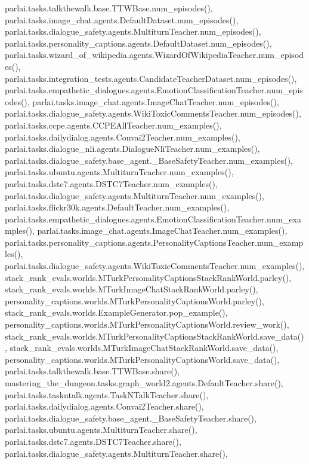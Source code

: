 parlai.\+tasks.\+talkthewalk.\+base.\+T\+T\+W\+Base.\+num\+\_\+episodes(), parlai.\+tasks.\+image\+\_\+chat.\+agents.\+Default\+Dataset.\+num\+\_\+episodes(), parlai.\+tasks.\+dialogue\+\_\+safety.\+agents.\+Multiturn\+Teacher.\+num\+\_\+episodes(), parlai.\+tasks.\+personality\+\_\+captions.\+agents.\+Default\+Dataset.\+num\+\_\+episodes(), parlai.\+tasks.\+wizard\+\_\+of\+\_\+wikipedia.\+agents.\+Wizard\+Of\+Wikipedia\+Teacher.\+num\+\_\+episodes(), parlai.\+tasks.\+integration\+\_\+tests.\+agents.\+Candidate\+Teacher\+Dataset.\+num\+\_\+episodes(), parlai.\+tasks.\+empathetic\+\_\+dialogues.\+agents.\+Emotion\+Classification\+Teacher.\+num\+\_\+episodes(), parlai.\+tasks.\+image\+\_\+chat.\+agents.\+Image\+Chat\+Teacher.\+num\+\_\+episodes(), parlai.\+tasks.\+dialogue\+\_\+safety.\+agents.\+Wiki\+Toxic\+Comments\+Teacher.\+num\+\_\+episodes(), parlai.\+tasks.\+ccpe.\+agents.\+C\+C\+P\+E\+All\+Teacher.\+num\+\_\+examples(), parlai.\+tasks.\+dailydialog.\+agents.\+Convai2\+Teacher.\+num\+\_\+examples(), parlai.\+tasks.\+dialogue\+\_\+nli.\+agents.\+Dialogue\+Nli\+Teacher.\+num\+\_\+examples(), parlai.\+tasks.\+dialogue\+\_\+safety.\+base\+\_\+agent.\+\_\+\+Base\+Safety\+Teacher.\+num\+\_\+examples(), parlai.\+tasks.\+ubuntu.\+agents.\+Multiturn\+Teacher.\+num\+\_\+examples(), parlai.\+tasks.\+dstc7.\+agents.\+D\+S\+T\+C7\+Teacher.\+num\+\_\+examples(), parlai.\+tasks.\+dialogue\+\_\+safety.\+agents.\+Multiturn\+Teacher.\+num\+\_\+examples(), parlai.\+tasks.\+flickr30k.\+agents.\+Default\+Teacher.\+num\+\_\+examples(), parlai.\+tasks.\+empathetic\+\_\+dialogues.\+agents.\+Emotion\+Classification\+Teacher.\+num\+\_\+examples(), parlai.\+tasks.\+image\+\_\+chat.\+agents.\+Image\+Chat\+Teacher.\+num\+\_\+examples(), parlai.\+tasks.\+personality\+\_\+captions.\+agents.\+Personality\+Captions\+Teacher.\+num\+\_\+examples(), parlai.\+tasks.\+dialogue\+\_\+safety.\+agents.\+Wiki\+Toxic\+Comments\+Teacher.\+num\+\_\+examples(), stack\+\_\+rank\+\_\+evals.\+worlds.\+M\+Turk\+Personality\+Captions\+Stack\+Rank\+World.\+parley(), stack\+\_\+rank\+\_\+evals.\+worlds.\+M\+Turk\+Image\+Chat\+Stack\+Rank\+World.\+parley(), personality\+\_\+captions.\+worlds.\+M\+Turk\+Personality\+Captions\+World.\+parley(), stack\+\_\+rank\+\_\+evals.\+worlds.\+Example\+Generator.\+pop\+\_\+example(), personality\+\_\+captions.\+worlds.\+M\+Turk\+Personality\+Captions\+World.\+review\+\_\+work(), stack\+\_\+rank\+\_\+evals.\+worlds.\+M\+Turk\+Personality\+Captions\+Stack\+Rank\+World.\+save\+\_\+data(), stack\+\_\+rank\+\_\+evals.\+worlds.\+M\+Turk\+Image\+Chat\+Stack\+Rank\+World.\+save\+\_\+data(), personality\+\_\+captions.\+worlds.\+M\+Turk\+Personality\+Captions\+World.\+save\+\_\+data(), parlai.\+tasks.\+talkthewalk.\+base.\+T\+T\+W\+Base.\+share(), mastering\+\_\+the\+\_\+dungeon.\+tasks.\+graph\+\_\+world2.\+agents.\+Default\+Teacher.\+share(), parlai.\+tasks.\+taskntalk.\+agents.\+Task\+N\+Talk\+Teacher.\+share(), parlai.\+tasks.\+dailydialog.\+agents.\+Convai2\+Teacher.\+share(), parlai.\+tasks.\+dialogue\+\_\+safety.\+base\+\_\+agent.\+\_\+\+Base\+Safety\+Teacher.\+share(), parlai.\+tasks.\+ubuntu.\+agents.\+Multiturn\+Teacher.\+share(), parlai.\+tasks.\+dstc7.\+agents.\+D\+S\+T\+C7\+Teacher.\+share(), parlai.\+tasks.\+dialogue\+\_\+safety.\+agents.\+Multiturn\+Teacher.\+share(), 